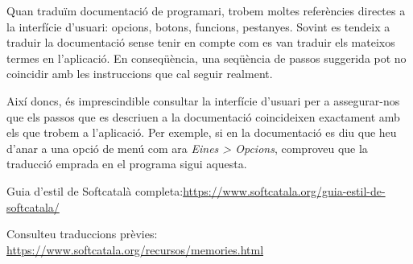 \documentclass[9pt]{cheatsheet}
\begin{document}
\begin{multicols*}{3}

Quan traduïm documentació de programari, trobem moltes referències directes a la interfície d'usuari: opcions, botons, funcions, pestanyes. Sovint es tendeix a traduir la documentació sense tenir en compte com es van traduir els mateixos termes en l'aplicació. En conseqüència, una seqüència de passos suggerida pot no coincidir amb les instruccions que cal seguir realment. 

Així doncs, és imprescindible consultar la interfície d'usuari per a assegurar-nos que els passos que es descriuen a la documentació coincideixen exactament amb els que trobem a l'aplicació. Per exemple, si en la documentació es diu que heu d'anar a una opció de menú com ara \emph{Eines > Opcions}, comproveu que la traducció emprada en el programa sigui aquesta.


Guia d'estil de Softcatalà completa:\url{https://www.softcatala.org/guia-estil-de-softcatala/}

Consulteu traduccions prèvies: \url{https://www.softcatala.org/recursos/memories.html}

\end{multicols*}
\end{document}
